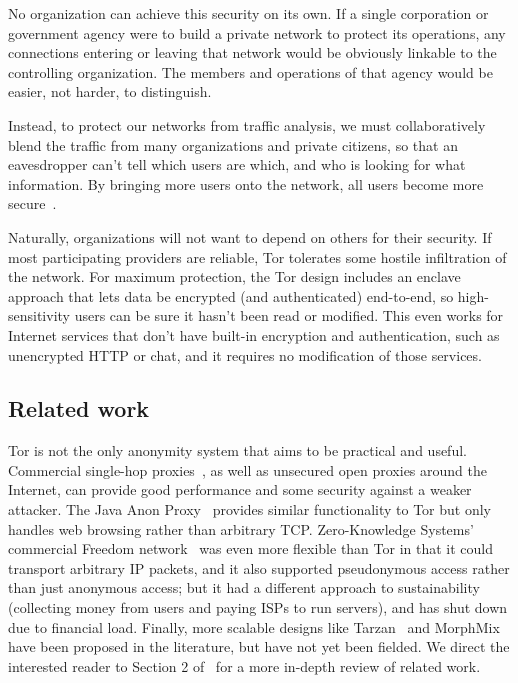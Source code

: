 \documentclass{llncs}
\begin{document}
No organization can achieve this security on its own.  If a single
corporation or government agency were to build a private network to
protect its operations, any connections entering or leaving that network
would be obviously linkable to the controlling organization.  The members
and operations of that agency would be easier, not harder, to distinguish.

Instead, to protect our networks from traffic analysis, we must
collaboratively blend the traffic from many organizations and private
citizens, so that an eavesdropper can't tell which users are which,
and who is looking for what information.  By bringing more users onto
the network, all users become more secure~\cite{econymics}.

Naturally, organizations will not want to depend on others for their
security.  If most participating providers are reliable, Tor tolerates
some hostile infiltration of the network.  For maximum protection,
the Tor design includes an enclave approach that lets data be encrypted
(and authenticated) end-to-end, so high-sensitivity users can be sure it
hasn't been read or modified.  This even works for Internet services that
don't have built-in encryption and authentication, such as unencrypted
HTTP or chat, and it requires no modification of those services.


\subsection{Related work}
Tor is not the only anonymity system that aims to be practical and useful.
Commercial single-hop proxies~\cite{anonymizer}, as well as unsecured
open proxies around the Internet, can provide good
performance and some security against a weaker attacker. The Java
Anon Proxy~\cite{web-mix} provides similar functionality to Tor but only
handles web browsing rather than arbitrary TCP\@.
Zero-Knowledge Systems' commercial Freedom
network~\cite{freedom21-security} was even more flexible than Tor in
that it could transport arbitrary IP packets, and it also supported
pseudonymous access rather than just anonymous access; but it had
a different approach to sustainability (collecting money from users
and paying ISPs to run servers), and has shut down due to financial
load.  Finally, more scalable designs like Tarzan~\cite{tarzan:ccs02} and
MorphMix~\cite{morphmix:fc04} have been proposed in the literature, but
have not yet been fielded. We direct the interested reader to Section
2 of~\cite{tor-design} for a more in-depth review of related work.
\end{document}
